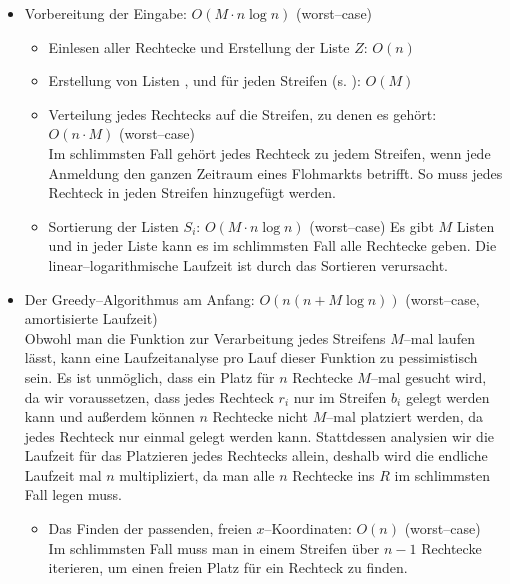 \begin{itemize}
	\item Vorbereitung der Eingabe: $O(M \cdot n \log n)$ (worst--case)
	\begin{itemize}
		\item Einlesen aller Rechtecke und Erstellung der Liste $Z$: $O(n)$

		\item Erstellung von Listen ,  und 
		für jeden Streifen (s. ): $O(M)$

		\item Verteilung jedes Rechtecks auf die Streifen, zu denen es gehört: $O(n \cdot M)$ (worst--case)\\
		Im schlimmsten Fall gehört jedes Rechteck zu jedem Streifen, wenn jede Anmeldung
		den ganzen Zeitraum eines Flohmarkts betrifft.
		So muss jedes Rechteck in jeden Streifen hinzugefügt werden.

		\item Sortierung der Listen $S_i$: $O(M \cdot n \log n)$ (worst--case)
		Es gibt $M$ Listen und in jeder Liste kann es im schlimmsten Fall
		alle Rechtecke geben. Die linear--logarithmische Laufzeit
		ist durch das Sortieren verursacht.
	\end{itemize}

	\item Der Greedy--Algorithmus am Anfang: $O(n(n + M \log n))$ (worst--case, amortisierte Laufzeit)\\
	Obwohl man die Funktion zur Verarbeitung jedes Streifens $M$--mal 
	laufen lässt, kann eine Laufzeitanalyse pro Lauf dieser Funktion zu pessimistisch sein.
	Es ist unmöglich, dass ein Platz für $n$ Rechtecke $M$--mal gesucht wird,
	da wir voraussetzen, dass jedes Rechteck $r_i$ nur im Streifen $b_i$ gelegt werden kann
	und außerdem können $n$ Rechtecke nicht $M$--mal platziert werden, da jedes Rechteck
	nur einmal gelegt werden kann.
	Stattdessen analysien wir die Laufzeit für das Platzieren jedes Rechtecks allein,
	deshalb wird die endliche Laufzeit mal $n$ multipliziert, da man alle $n$ Rechtecke ins $R$
	im schlimmsten Fall legen muss.

	\begin{itemize}
		\item Das Finden der passenden, freien $x$--Koordinaten: $O(n)$ (worst--case)\\
		Im schlimmsten Fall muss man in einem Streifen über $n-1$ Rechtecke iterieren,
		um einen freien Platz für ein Rechteck zu finden.


\end{itemize}
\end{itemize}
